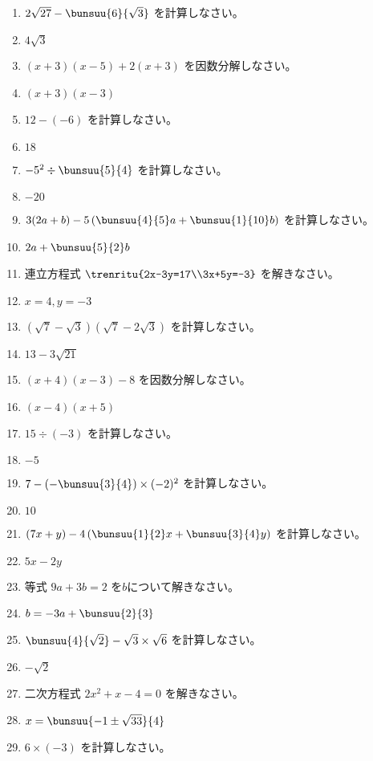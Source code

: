 \documentclass[uplatex,a4j,11pt]{jsreport}
\begin{document}
\begin{multicols}{2}
\begin{enumerate}
    \item $2\sqrt{27}-\bunsuu{6}{\sqrt{3}}$ を計算しなさい。%
    \item $4\sqrt{3}$
    \item $(x+3)(x-5)+2(x+3)$ を因数分解しなさい。%
    \item $(x+3)(x-3)$
    \item $12-(-6)$ を計算しなさい。%
    \item $18$
    \item $-5^2\div\bunsuu{5}{4}$ を計算しなさい。%
    \item $-20$
    \item $3(2a+b)-5\left(\bunsuu{4}{5}a+\bunsuu{1}{10}b\right)$ を計算しなさい。%
    \item $2a+\bunsuu{5}{2}b$
    \item 連立方程式 $\trenritu{2x-3y=17\\3x+5y=-3}$ を解きなさい。%
    \item $x=4, y=-3$
    \item $(\sqrt{7}-\sqrt{3})(\sqrt{7}-2\sqrt{3})$ を計算しなさい。%
    \item $13-3\sqrt{21}$
    \item $(x+4)(x-3)-8$ を因数分解しなさい。%
    \item $(x-4)(x+5)$
    \item $15\div(-3)$ を計算しなさい。%
    \item $-5$
    \item $7-\left(-\bunsuu{3}{4}\right)\times(-2)^2$ を計算しなさい。%
    \item $10$
    \item $(7x+y)-4\left(\bunsuu{1}{2}x+\bunsuu{3}{4}y\right)$ を計算しなさい。%
    \item $5x-2y$
    \item 等式 $9a+3b=2$ を$b$について解きなさい。%
    \item $b=-3a+\bunsuu{2}{3}$
    \item $\bunsuu{4}{\sqrt{2}}-\sqrt{3}\times\sqrt{6}$ を計算しなさい。%
    \item $-\sqrt{2}$
    \item 二次方程式 $2x^2+x-4=0$ を解きなさい。%
    \item $x=\bunsuu{-1\pm\sqrt{33}}{4}$
    \item $6\times(-3)$ を計算しなさい。%

\end{enumerate}
\end{multicols}
\end{document}
